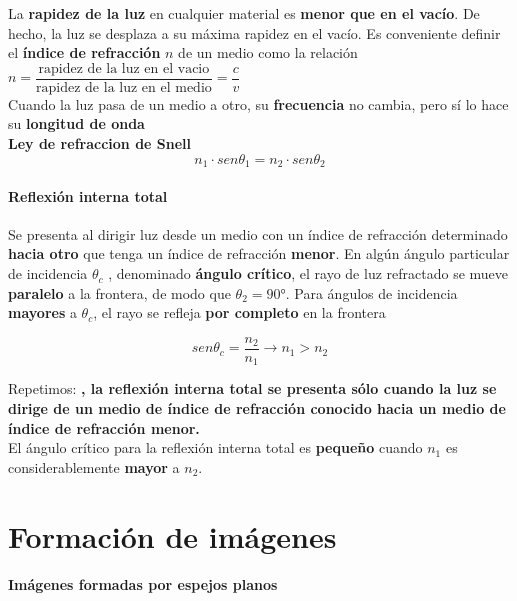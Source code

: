 \documentclass[10pt]{article}
\begin{document}
La \textbf{rapidez de la luz} en cualquier material es \textbf{menor que en el vacío}. De hecho, la luz se desplaza a su máxima rapidez en el vacío. Es conveniente definir el \textbf{índice de refracción} $n$ de un medio como la relación $n = \dfrac{\text{rapidez de la luz en el vacio}}{\text{rapidez de la luz en el medio}} = \dfrac{c}{v}$\\
\linebreak
Cuando la luz pasa de un medio a otro, su \textbf{frecuencia} no cambia, pero sí lo hace su \textbf{longitud de onda}\\
\linebreak
\textbf{Ley de refraccion de Snell}
\begin{equation*}
	n_1 \cdot sen \theta_1 = n_2 \cdot sen \theta_2
\end{equation*}

\paragraph{Reflexión interna total}

Se presenta al dirigir luz desde un medio con un índice de refracción determinado \textbf{hacia otro} que tenga un índice de refracción \textbf{menor}. En algún ángulo particular de incidencia $\theta_c$ , denominado \textbf{ángulo crítico}, el rayo de luz refractado se mueve \textbf{paralelo} a la frontera, de modo que $\theta_2 = 90°$. Para ángulos de incidencia \textbf{mayores} a $\theta_c$, el rayo se refleja \textbf{por completo} en la frontera

\begin{equation*}
	sen \theta_c = \frac{n_2}{n_1} \rightarrow n_1 > n_2
\end{equation*}

Repetimos: \textbf{, la reflexión interna total se presenta sólo cuando la luz se dirige de un medio de índice de refracción conocido hacia un medio de índice de refracción menor.}\\
\linebreak
El ángulo crítico para la reflexión interna total es \textbf{pequeño} cuando $n_1$ es considerablemente \textbf{mayor} a $n_2$.

\section{Formación de imágenes}

\paragraph{Imágenes formadas por espejos planos}
\end{document}
